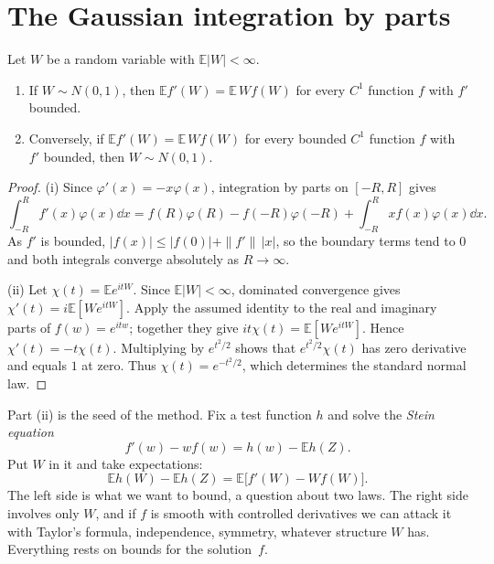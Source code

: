\section{The Gaussian integration by parts}

\begin{lemma}\label{lem:stein}
Let $W$ be a random variable with $\mathbb E|W|<\infty$.
\begin{enumerate}[label=(\roman*)]
\item If $W\sim N(0,1)$, then $\mathbb Ef'(W)=\mathbb E\,Wf(W)$ for every $C^1$ function $f$ with $f'$ bounded.
\item Conversely, if $\mathbb Ef'(W)=\mathbb E\,Wf(W)$ for every bounded $C^1$ function $f$ with $f'$ bounded, then $W\sim N(0,1)$.
\end{enumerate}
\end{lemma}
\begin{proof}
(i) Since $\varphi'(x)=-x\varphi(x)$, integration by parts on $[-R,R]$ gives
\[
\int_{-R}^Rf'(x)\varphi(x)\dd x=f(R)\varphi(R)-f(-R)\varphi(-R)+\int_{-R}^Rxf(x)\varphi(x)\dd x.
\]
As $f'$ is bounded, $|f(x)|\le|f(0)|+\|f'\|\,|x|$, so the boundary terms tend to $0$ and both integrals converge absolutely as $R\to\infty$.

(ii) Let $\chi(t)=\mathbb E e^{itW}$. Since $\mathbb E|W|<\infty$, dominated convergence gives $\chi'(t)=i\mathbb E[We^{itW}]$. Apply the assumed identity to the real and imaginary parts of $f(w)=e^{itw}$; together they give $it\chi(t)=\mathbb E[We^{itW}]$. Hence $\chi'(t)=-t\chi(t)$. Multiplying by $e^{t^2/2}$ shows that $e^{t^2/2}\chi(t)$ has zero derivative and equals $1$ at zero. Thus $\chi(t)=e^{-t^2/2}$, which determines the standard normal law.
\end{proof}

Part (ii) is the seed of the method. Fix a test function $h$ and solve the \emph{Stein equation}
\begin{equation}\label{eq:steineq}
f'(w)-wf(w)=h(w)-\mathbb Eh(Z).
\end{equation}
Put $W$ in it and take expectations:
\begin{equation}\label{eq:steinid}
\mathbb Eh(W)-\mathbb Eh(Z)=\mathbb E\bigl[f'(W)-Wf(W)\bigr].
\end{equation}
The left side is what we want to bound, a question about two laws. The right side involves only $W$, and if $f$ is smooth with controlled derivatives we
can attack it with Taylor's formula, independence, symmetry, whatever structure $W$ has. Everything rests on bounds for the solution~$f$.

